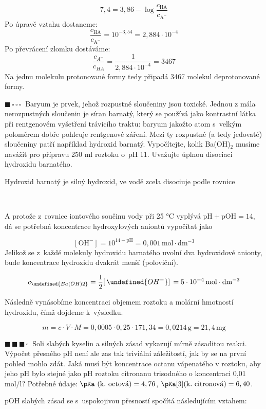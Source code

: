 \documentclass{book}
\let\ch\undefined
\newcommand{\jeden}{$\blacksquare \, \square \, \square \, \square \; \; $}
\newcommand{\tri}{$\blacksquare \, \blacksquare \, \blacksquare \, \square \; \; $}
\renewenvironment{quotation}{\par}{\par} %
\begin{document}
\[
7,4=3,86-\log\frac{c_{\mathrm{HA}}}{c_{\mathrm{A^{-}}}}
\]
Po úpravě vztahu dostaneme: 
\[
\frac{c_{\mathrm{HA}}}{c_{\mathrm{A^{-}}}}=10^{-3,54}=2,884\cdot10^{-4}
\]
 Po převrácení zlomku dostáváme: 
\[
\frac{c_{A^{-}}}{c_{HA}}=\frac{1}{2,884\cdot10^{-4}}=3467
\]
Na jednu molekulu protonované formy tedy připadá 3467 molekul deprotonované
formy.

\hrulefill %
\begin{quotation}
\jeden Baryum je prvek, jehož rozpustné sloučeniny jsou toxické. Jednou z
mála nerozpustných sloučenin je síran barnatý, který se používá jako
kontrastní látka při rentgenovém vyšetření trávicího traktu: baryum
jakožto atom s~velkým poloměrem dobře pohlcuje rentgenové záření.
Mezi ty rozpustné (a tedy jedovaté) sloučeniny patří například hydroxid
barnatý. Vypočítejte, kolik Ba(OH)$_{2}$ musíme navážit pro přípravu
250 ml roztoku o~pH 11. Uvažujte úplnou disociaci hydroxidu barnatého.
\end{quotation} \dotfill \par 
Hydroxid barnatý je silný hydroxid, ve vodě zcela disociuje podle
rovnice

\shorthandoff{-}
\begin{center}
\ch{Ba(OH)2 -> Ba^{2+} + 2 OH^{-}}\\
\end{center}
\shorthandon{-}
A protože z~rovnice iontového součinu vody
při 25 °C vyplývá $\mathrm{pH+pOH=14}$, dá se potřebná koncentrace hydroxylových aniontů vypočítat jako

\[
\mathrm{[OH^{-}]=10^{14-pH}}=0,001\,\mathrm{mol\cdot dm^{-3}}
\]
Jelikož se z~každé molekuly hydroxidu barnatého uvolní dva hydroxidové anionty, bude koncentrace hydroxidu dvakrát menší (poloviční).

\[
c_{\ch{Ba(OH)2}}=\frac{1}{2}[ \,\ch{OH^{-}}] \,=5\cdot10^{-4}\,\mathrm{mol\cdot dm^{-3}}
\]

Následně vynásobíme koncentraci objemem roztoku a molární hmotností hydroxidu, čímž dojdeme k~výsledku.

\[
m=c\cdot V\cdot M=0,0005\cdot0,25\cdot171,34=0,0214\,\mathrm{g=21,4\,mg}
\]


\hrulefill %
\begin{quotation}
\tri Soli slabých kyselin a silných zásad vykazují mírně zásaditou reakci.
Výpočet přesného pH není ale zas tak triviální záležitostí, jak by
se na první pohled mohlo zdát. Jaká musí být koncentrace octanu vápenatého
v roztoku, aby jeho pH bylo stejné jako pH roztoku citronanu trisodného
o koncentraci 0,01 mol/l? Potřebné údaje:
$\pKa~\mathrm{(k.~octov\acute{a})=4,76}$,
$\pKa[3]\mathrm{(k.~citronov\acute{a})=6,40}$. 
\end{quotation} \dotfill \par 
pOH slabých zásad se s~uspokojivou přesností spočítá následujícím
vztahem:
\end{document}
